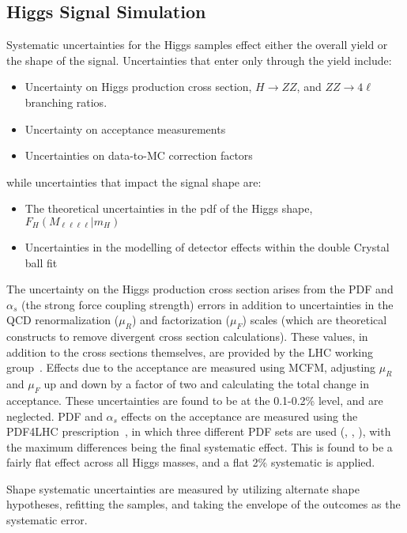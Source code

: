 \subsection{Higgs Signal Simulation}
Systematic uncertainties for the Higgs samples effect either the overall
yield or the shape of the signal. Uncertainties that enter only through the
yield include:
\begin{itemize}
\item Uncertainty on Higgs production cross section, $H\rightarrow ZZ$, and
    $ZZ\rightarrow 4\ell$ branching ratios.
\item Uncertainty on acceptance measurements
\item Uncertainties on data-to-MC correction factors
\end{itemize}
while uncertainties that impact the signal shape are:
\begin{itemize}
    \item The theoretical uncertainties in the pdf of the Higgs shape, $F_H(M_{\ell\ell\ell\ell} | m_H)$
    \item Uncertainties in the modelling of detector effects within the double
        Crystal ball fit
\end{itemize}

The uncertainty on the Higgs production cross section arises from the PDF and
$\alpha_s$ (the strong force coupling strength) errors in addition to
uncertainties in the QCD renormalization ($\mu_R$)  and 
factorization ($\mu_F$) scales (which are theoretical constructs to remove
divergent cross section calculations).
These values, in addition to the cross sections themselves, are provided by the
LHC working group~\cite{lhcHiggsHandbook}.  Effects due to the acceptance are
measured using MCFM, adjusting $\mu_R$ and $\mu_F$ up and down by a factor of
two and calculating the total change in acceptance. These uncertainties are
found to be at the 0.1-0.2\% level, and are neglected. PDF and $\alpha_s$
effects on the acceptance are measured using the PDF4LHC
prescription~\cite{PDF4LHC}, in which three different PDF sets are used
(\cite{ct10}, \cite{MSTW08}, \cite{nnPDF}), with the maximum differences being
the final systematic effect. This is found to be a fairly flat effect across all
Higgs masses, and a flat 2\% systematic is applied.

Shape systematic uncertainties are measured by utilizing alternate shape
hypotheses, refitting the samples, and taking the envelope of the outcomes as
the systematic error.

